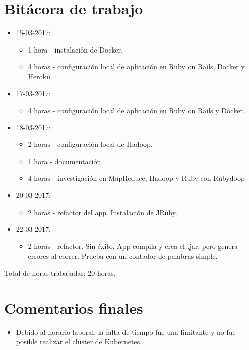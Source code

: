 \documentclass{article}
\begin{document}
\section{Bit\'acora de trabajo}
\begin{itemize}
  \item 15-03-2017:
  \begin{itemize}
    \item 1 hora - instalaci\'on de Docker.
    \item 4 horas - configuraci\'on local de aplicaci\'on en Ruby on Rails, Docker y Heroku.
  \end{itemize}
  \item 17-03-2017:
  \begin{itemize}
    \item 4 horas - configuraci\'on local de aplicaci\'on en Ruby on Rails y Docker.
  \end{itemize}
  \item 18-03-2017:
  \begin{itemize}
    \item 2 horas - configuraci\'on local de Hadoop.
    \item 1 hora - documentaci\'on.
    \item 4 horas - investigaci\'on en MapReduce, Hadoop y Ruby con Rubydoop
  \end{itemize}
  \item 20-03-2017:
  \begin{itemize}
    \item 2 horas - refactor del app. Instalaci\'on de JRuby.
  \end{itemize}
  \item 22-03-2017:
  \begin{itemize}
    \item 2 horas - refactor. Sin \'exito. App compila y crea el .jar, pero genera errores al correr. Prueba con un contador de palabras simple.
  \end{itemize}
\end{itemize}
Total de horas trabajadas: 20 horas.

\section{Comentarios finales}
\begin{itemize}
  \item Debido al horario laboral, la falta de tiempo fue una limitante y no fue posible realizar el cluster de Kubernetes. 
\end{itemize}
\end{document}
